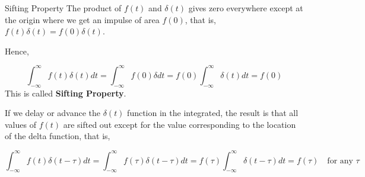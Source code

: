 \documentclass[aspectratio=169,xcolor=dvipsnames,svgnames,x11names,fleqn]{beamer}
\begin{document}
\begin{frame}{Sifting Property}
The product of $f (t)$ and $\delta(t)$ gives zero everywhere except at the origin where we get an impulse of area $f (0)$, that is, $f (t)\delta(t) = f (0)\delta(t)$.

Hence,

$$
\int_{-\infty}^\infty f(t)\delta(t)dt = \int_{-\infty}^\infty f(0)\delta dt = f(0) \int_{-\infty}^\infty\delta (t) dt  = f(0)
$$
This is called \textbf{Sifting Property}.

If we delay or advance the $\delta(t)$ function in the integrated, the result is that all values of $f (t)$ are sifted out except for the value corresponding to the location of the delta function, that is,

$$
\int_{-\infty}^\infty f(t)\delta(t - \tau)dt  = \int_{-\infty}^\infty f(\tau)\delta(t- \tau) dt  = f(\tau) \int_{-\infty}^\infty \delta(t-\tau) dt  = f(\tau)\quad \text{for any }\tau
$$

\end{frame}
\end{document}
